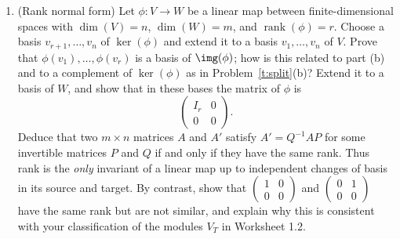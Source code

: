\documentclass[12pt,reqno]{amsart}
\providecommand{\rank}{\operatorname{rank}}
\begin{document}
\begin{problems}
\begin{enumerate}
\[
0\longrightarrow U\cap U'\longrightarrow U\oplus U'\longrightarrow U+U'\longrightarrow0,
\qquad x\longmapsto(x,-x),\qquad (u,u')\longmapsto u+u',
\]
is exact, and deduce that $\dim(U+U')+\dim(U\cap U')=\dim(U)+\dim(U')$. Deduce that any two $2$-dimensional subspaces of $\KK^3$ meet in a subspace of dimension at least one.
\item (Rank normal form) Let $\phi:V\to W$ be a linear map between finite-dimensional spaces with $\dim(V)=n$, $\dim(W)=m$, and $\rank(\phi)=r$. Choose a basis $v_{r+1},\ldots,v_n$ of $\ker(\phi)$ and extend it to a basis $v_1,\ldots,v_n$ of $V$. Prove that $\phi(v_1),\ldots,\phi(v_r)$ is a basis of $\img(\phi)$; how is this related to part (b) and to a complement of $\ker(\phi)$ as in Problem~\ref{t:split}(b)? Extend it to a basis of $W$, and show that in these bases the matrix of $\phi$ is
\[
\begin{pmatrix}I_r&0\\0&0\end{pmatrix}.
\]
Deduce that two $m\times n$ matrices $A$ and $A'$ satisfy $A'=Q^{-1}AP$ for some invertible matrices $P$ and $Q$ if and only if they have the same rank. Thus rank is the \emph{only} invariant of a linear map up to independent changes of basis in its source and target. By contrast, show that $\left(\begin{smallmatrix}1&0\\0&0\end{smallmatrix}\right)$ and $\left(\begin{smallmatrix}0&1\\0&0\end{smallmatrix}\right)$ have the same rank but are not similar, and explain why this is consistent with your classification of the modules $V_T$ in Worksheet 1.2.
\end{enumerate}
\end{problems}

\hrulefill
\end{document}
